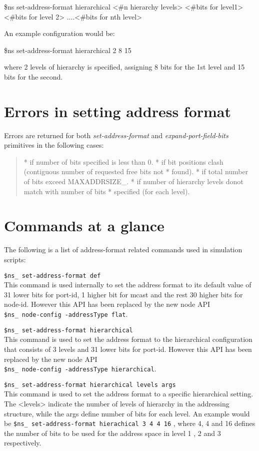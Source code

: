 \$ns set-address-format hierarchical <\#n hierarchy levels> <\#bits for
level1> <\#bits for level 2> ....<\#bits for nth level> 


An example configuration would be:

\$ns set-address-format hierarchical 2 8 15 

where 2 levels of hierarchy is specified, assigning 8 bits for the 1st
level and 15 bits for the second.


\section{Errors in setting address format}
\label{sec:err-add}

Errors are returned for both {\em set-address-format} and
{\em expand-port-field-bits} primitives in the following cases:
\begin{quote}
* if number of bits specified is less than 0.
* if bit positions clash (contiguous number of requested free bits not
* found).  
* if total number of bits exceed MAXADDRSIZE\_.
* if number of hierarchy levels donot match with number of bits
* specified (for each level).  
\end{quote}

\section{Commands at a glance}
\label{sec:addresscommand}

The following is a list of address-format related commands used in simulation
scripts:
\begin{flushleft}
{\tt \$ns\_ set-address-format def}\\
This command is used internally to set the address format to its default value
of 31 lower bits for port-id, 1 higher bit for mcast and the rest 30 higher bits
for node-id. However this API has been replaced by the new node API\\
{\tt \$ns\_ node-config -addressType flat}.


{\tt \$ns\_ set-address-format hierarchical}\\
This command is used to set the address format to the hierarchical configuration
that consists of 3 levels and 31 lower bits
for port-id. However this API has been replaced by the new node API\\
{\tt \$ns\_ node-config -addressType hierarchical}.


{\tt \$ns\_ set-address-format hierarchical \<levels\> \<args\>}\\
This command is used to set the address format to a specific hierarchical
setting. The <levels> indicate the number of levels of hierarchy in the addressing
structure, while the args define number of bits for each level. An example
would be {\tt \$ns\_ set-address-format hierachical 3 4 4 16} , where 4, 4 and
16 defines the number of bits to be used for the address space in level 1 , 2
and 3 respectively.


\end{flushleft}
\endinput





